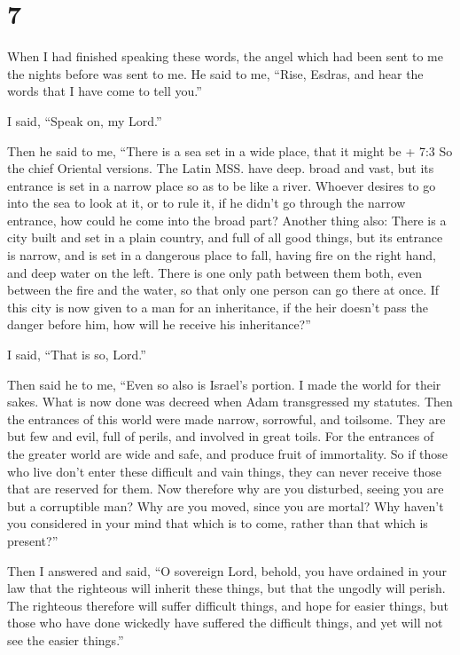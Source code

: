 \hypertarget{section-6}{%
\section{7}\label{section-6}}

 When I had finished speaking these words, the angel which
had been sent to me the nights before was sent to me.  He
said to me, ``Rise, Esdras, and hear the words that I have come to tell
you.''

 I said, ``Speak on, my Lord.''

Then he said to me, ``There is a sea set in a wide place, that it might
be + 7:3 So the chief Oriental versions. The Latin MSS. have deep. broad
and vast,  but its entrance is set in a narrow place so as
to be like a river.  Whoever desires to go into the sea to
look at it, or to rule it, if he didn't go through the narrow entrance,
how could he come into the broad part?  Another thing also:
There is a city built and set in a plain country, and full of all good
things,  but its entrance is narrow, and is set in a
dangerous place to fall, having fire on the right hand, and deep water
on the left.  There is one only path between them both, even
between the fire and the water, so that only one person can go there at
once.  If this city is now given to a man for an
inheritance, if the heir doesn't pass the danger before him, how will he
receive his inheritance?''

 I said, ``That is so, Lord.''

Then said he to me, ``Even so also is Israel's portion.  I
made the world for their sakes. What is now done was decreed when Adam
transgressed my statutes.  Then the entrances of this world
were made narrow, sorrowful, and toilsome. They are but few and evil,
full of perils, and involved in great toils.  For the
entrances of the greater world are wide and safe, and produce fruit of
immortality.  So if those who live don't enter these
difficult and vain things, they can never receive those that are
reserved for them.  Now therefore why are you disturbed,
seeing you are but a corruptible man? Why are you moved, since you are
mortal?  Why haven't you considered in your mind that which
is to come, rather than that which is present?''

 Then I answered and said, ``O sovereign Lord, behold, you
have ordained in your law that the righteous will inherit these things,
but that the ungodly will perish.  The righteous therefore
will suffer difficult things, and hope for easier things, but those who
have done wickedly have suffered the difficult things, and yet will not
see the easier things.''

